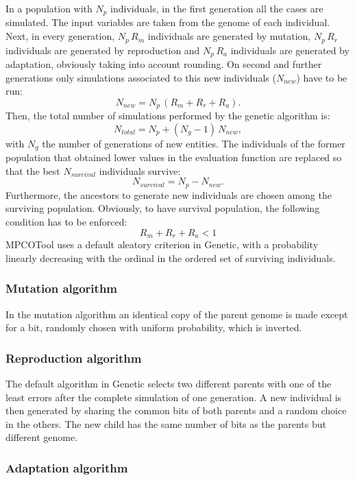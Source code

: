 \documentclass[review,authoryear]{elsarticle}
\newcommand{\EQ}[2]
{\begin{equation}#1\label{#2}\end{equation}}
\begin{document}
In a population with $N_p$ individuals, in the first generation all the cases are simulated. The input variables are
taken from the genome of each individual. Next, in every generation, $N_p\,R_m$ individuals are generated by mutation, $N_p\,R_r$ individuals are generated by reproduction and $N_p\,R_a$ individuals are generated by adaptation, obviously
taking into account rounding. On second and further generations only simulations
associated to this new individuals ($N_{new}$) have to be run:
\EQ{N_{new}=N_p\,\left(R_m+R_r+R_a\right).}{EqNew}
Then, the total number of simulations performed by the genetic algorithm is:
\EQ{N_{total}=N_p+\left(N_g-1\right)\,N_{new},}{EqGeneticNumber}
with $N_g$ the number of generations of new entities.
The individuals of the former population that obtained lower values in the evaluation function are replaced so that the best $N_{survival}$ individuals survive:
\EQ{N_{survival}=N_p-N_{new}.}{EqSurvival}
Furthermore, the ancestors to generate new individuals are chosen among the surviving population. Obviously, to have survival population, the following condition has to be enforced:
\EQ{R_m+R_r+R_a<1}{EqSurvivalCondition}
MPCOTool uses a default aleatory criterion in Genetic, with a probability linearly decreasing with the ordinal in the ordered set of surviving individuals.

\subsubsection{Mutation algorithm}

In the mutation algorithm an identical copy of the parent genome is made except for a bit, randomly chosen with uniform probability, which is inverted.

\subsubsection{Reproduction algorithm}

The default algorithm in Genetic selects two different parents with one of the least errors after the 
complete simulation of one generation. 
A new individual is then generated by sharing the common bits of both parents and a random choice in the others.
The new child has the same number of bits as the parents but different genome.

\subsubsection{Adaptation algorithm}
\end{document}
